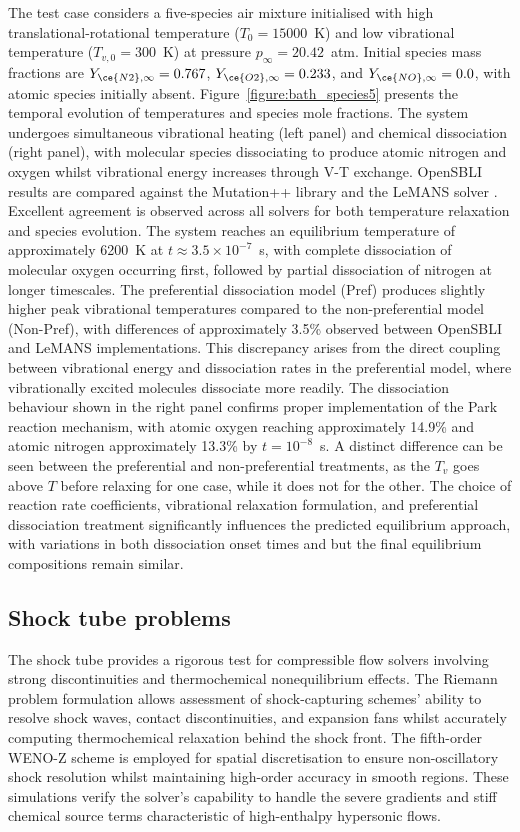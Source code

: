 The test case considers a five-species air mixture initialised with high translational-rotational temperature ($T_0 = 15000$~K) and low vibrational temperature ($T_{v,0} = 300$~K) at pressure $p_{\infty} = 20.42$~atm. Initial species mass fractions are $Y_{\ce{N2},\infty} = 0.767$, $Y_{\ce{O2},\infty} = 0.233$, and $Y_{\ce{NO},\infty} = 0.0$, with atomic species initially absent. Figure~\ref{figure:bath_species5} presents the temporal evolution of temperatures and species mole fractions. The system undergoes simultaneous vibrational heating (left panel) and chemical dissociation (right panel), with molecular species dissociating to produce atomic nitrogen and oxygen whilst vibrational energy increases through V-T exchange. OpenSBLI results are compared against the Mutation++ library \citep{Scoggins2020} and the LeMANS solver \citep{Scalabrin2005}. Excellent agreement is observed across all solvers for both temperature relaxation and species evolution. The system reaches an equilibrium temperature of approximately 6200~K at $t \approx 3.5 \times 10^{-7}$~s, with complete dissociation of molecular oxygen occurring first, followed by partial dissociation of nitrogen at longer timescales. The preferential dissociation model (Pref) produces slightly higher peak vibrational temperatures compared to the non-preferential model (Non-Pref), with differences of approximately 3.5\% observed between OpenSBLI and LeMANS implementations. This discrepancy arises from the direct coupling between vibrational energy and dissociation rates in the preferential model, where vibrationally excited molecules dissociate more readily. The dissociation behaviour shown in the right panel confirms proper implementation of the Park reaction mechanism, with atomic oxygen reaching approximately 14.9\% and atomic nitrogen approximately 13.3\% by $t = 10^{-8}$~s. A distinct difference can be seen between the preferential and non-preferential treatments, as the $T_v$ goes above $T$ before relaxing for one case, while it does not for the other. The choice of reaction rate coefficients, vibrational relaxation formulation, and preferential dissociation treatment significantly influences the predicted equilibrium approach, with variations in both dissociation onset times and but the final equilibrium compositions remain similar. 

\subsection{Shock tube problems}
The shock tube provides a rigorous test for compressible flow solvers involving strong discontinuities and thermochemical nonequilibrium effects. The Riemann problem formulation allows assessment of shock-capturing schemes' ability to resolve shock waves, contact discontinuities, and expansion fans whilst accurately computing thermochemical relaxation behind the shock front. The fifth-order WENO-Z scheme is employed for spatial discretisation to ensure non-oscillatory shock resolution whilst maintaining high-order accuracy in smooth regions. These simulations verify the solver's capability to handle the severe gradients and stiff chemical source terms characteristic of high-enthalpy hypersonic flows.

